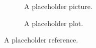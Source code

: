 \begin{figure}[h]
	\centering
   \resizebox{0.55\textwidth}{!}{}
	\caption{A placeholder picture.}
	\label{fig:placeholder}
\end{figure}

\begin{figure}[h]
	\centering
   \resizebox{0.55\textwidth}{!}{}
	\caption{A placeholder plot.}
	\label{fig:placeholder}
\end{figure}

A placeholder reference\cite{goens_multiprog18}.
